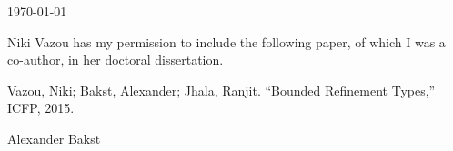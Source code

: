 \documentclass{article}
\begin{document}
\today

Niki Vazou has my permission to include the following paper, of which
I was a co-author, in her doctoral dissertation.

Vazou, Niki; Bakst, Alexander; Jhala, Ranjit.
``Bounded Refinement Types,'' ICFP, 2015.

\baselineskip
Alexander Bakst
\end{document}
